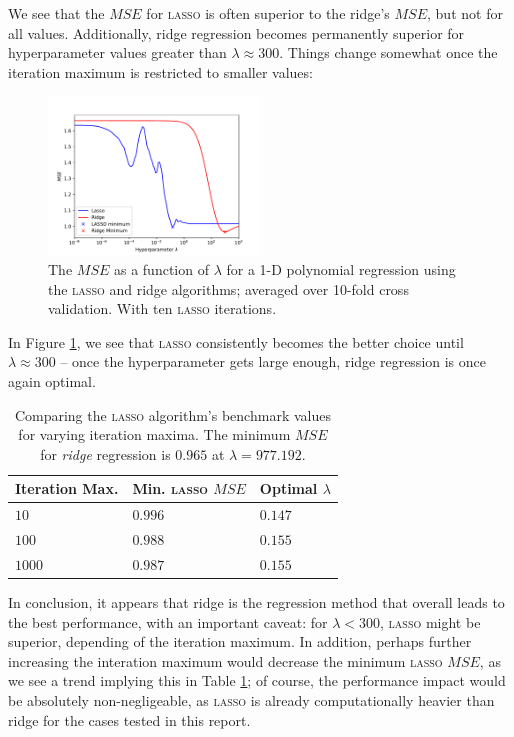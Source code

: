 \documentclass[a4paper,10pt,english]{article}
\begin{document}
\begin{multicols*}{2}
We see that the $MSE$ for \textsc{lasso} is often superior to the ridge's $MSE$, but not for all values.  Additionally, ridge regression becomes permanently superior for hyperparameter values greater than $\lambda \approx 300$.  Things change somewhat once the iteration maximum is restricted to smaller values:

\begin{figure}[H]
	\centering  
	\includegraphics[width = 0.5\textwidth, center]{../a_10_iter.pdf}
	\caption{The $MSE$ as a function of $\lambda$ for a 1-D polynomial regression using the \textsc{lasso} and ridge algorithms; averaged over 10-fold cross validation. With ten \textsc{lasso} iterations.}
	\label{fig_2}
\end{figure}

In Figure \ref{fig_2}, we see that \textsc{lasso} consistently becomes the better choice until $\lambda \approx 300$ – once the hyperparameter gets large enough, ridge regression is once again optimal.

\begin{table}[H]
\center
\begin{tabular}{l | l l}
Iteration Max. & Min. \textsc{lasso} $MSE$ & Optimal $\lambda$ \\
\hline
$10$ & $0.996$ & $0.147$ \\
$100$ & $0.988$ & $0.155$ \\
$1000$ & $0.987$ & $0.155$ \\
\end{tabular}
\caption{Comparing the \textsc{lasso} algorithm's benchmark values for varying iteration maxima.  The minimum $MSE$ for \textit{ridge} regression is $0.965$ at $\lambda = 977.192$.\label{table_1}}
\end{table}

In conclusion, it appears that ridge is the regression method that overall leads to the best performance, with an important caveat: for $\lambda < 300$, \textsc{lasso} might be superior, depending of the iteration maximum.  In addition, perhaps further increasing the interation maximum would decrease the minimum \textsc{lasso} $MSE$, as we see a trend implying this in Table \ref{table_1}; of course, the performance impact would be absolutely non-negligeable, as \textsc{lasso} is already computationally heavier than ridge for the cases tested in this report.


\end{multicols*}
\end{document}
